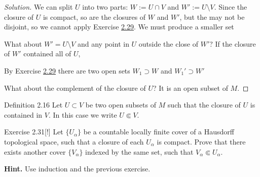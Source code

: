 \begin{proof}[Solution]\leavevmode
We can split \(U\) into two parts: \(W:=U\cap V\) and \(W':=U\setminus V\). Since the closure of \(U\) is compact, so are the closures of \(W\) and \(W'\), but the may not be disjoint, so we cannot apply Exercise \hyperref[exer:2.29]{2.29}. We must produce a smaller set

What about \(W'=U \setminus V\) and any point in \(U\) outside the close of \(W'\)? If the closure of \(W'\) contained all of \(U\),  

By Exercise \hyperref[exer:2.29]{2.29} there are two open sets \(W_1 \supset W\) and \(W_1' \supset W'\) 

What about the complement of the closure of \(U\)? It is an open subset of \(M\).

\end{proof}\fi

\begin{thing3}{Definition 2.16}\label{def:2.16}\leavevmode
Let \(U \subset V\) be two open subsets of \(M\) such that the closure of \(U\) is contained in \(V\). In this case we write \(U \Subset V\).
\end{thing3}

\begin{thing4}{Exercise 2.31}[!]\label{exer:2.31}\leavevmode
Let \(\{U_\alpha\}\) be a countable locally finite cover of a Hausdorff topological space, such that a closure of each \(U_\alpha\) is compact. Prove that there exists another cover \(\{V_\alpha\}\) indexed by the same set, such that \(V_\alpha \Subset U_\alpha\).

\textbf{Hint.} Use induction and the previous exercise.
\end{thing4}

